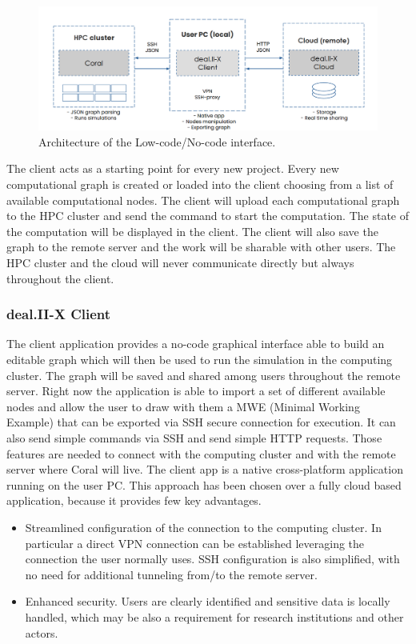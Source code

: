 \documentclass[a4paper,12pt]{article}
\begin{document}
\begin{figure}
  \centering

  \includegraphics[width=\textwidth]{dualistic-architecture.png}

  \caption{Architecture of the Low-code/No-code interface.}
  \label{fig:dualistic-architecture}
\end{figure}

The client acts as a starting point for every new project. Every new computational graph is created or loaded into the client choosing from a list of available computational nodes. The client will upload each computational graph to the HPC cluster and send the command to start the computation. The state of the computation will be displayed in the client. The client will also save the graph to the remote server and the work will be sharable with other users. The HPC cluster and the cloud will never communicate directly but always throughout the client.

\subsubsection{deal.II-X Client}

The client application provides a no-code graphical interface able to build an editable graph which will then be used to run the simulation in the computing cluster. The graph will be saved and shared among users throughout the remote server. Right now the application is able to import a set of different available nodes and allow the user to draw with them a MWE (Minimal Working Example) that can be exported via SSH secure connection for execution. It can also send simple commands via SSH and send simple HTTP requests. Those features are needed to connect with the computing cluster and with the remote server where Coral will live. The client app is a native cross-platform application running on the user PC. This approach has been chosen over a fully cloud based application, because it provides few key advantages.
\begin{itemize}
  \item Streamlined configuration of the connection to the computing cluster. In particular a direct VPN connection can be established leveraging the connection the user normally uses. SSH configuration is also simplified, with no need for additional tunneling from/to the remote server.
  \item Enhanced security. Users are clearly identified and sensitive data is locally handled, which may be also a requirement for research institutions and other actors.
\end{itemize}
\end{document}
